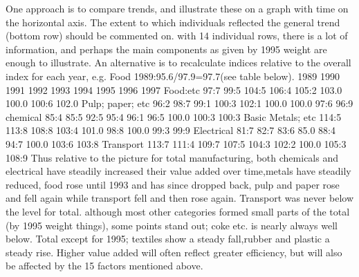 \documentclass[a4paper,12pt]{article}
\begin{document}
\begin{enumerate}
One approach is to compare trends, and illustrate these on a graph with time on the
horizontal axis. The extent to which individuals reflected the general trend (bottom
row) should be commented on. with 14 individual rows, there is a lot of information,
and perhaps the main components as given by 1995 weight are enough to illustrate.
An alternative is to recalculate indices relative to the overall index for each year, e.g.
Food 1989:95.6/97.9=97.7(see table below).
1989 1990 1991 1992 1993 1994 1995 1996 1997
Food:etc 97:7 99:5 104:5 106:4 105:2 103.0 100.0 100:6 102.0
Pulp; paper; etc 96:2 98:7 99:1 100:3 102:1 100.0 100.0 97:6 96:9
chemical 85:4 85:5 92:5 95:4 96:1 96:5 100.0 100:3 100:3
Basic Metals; etc 114:5 113:8 108:8 103:4 101.0 98:8 100.0 99:3 99:9
Electrical 81:7 82:7 83:6 85.0 88:4 94:7 100.0 103:6 103:8
Transport 113:7 111:4 109:7 107:5 104:3 102:2 100.0 105:3 108:9
Thus relative to the picture for total manufacturing, both chemicals and electrical have
steadily increased their value added over time,metals have steadily reduced, food rose
until 1993 and has since dropped back, pulp and paper rose and fell again while transport
fell and then rose again.
Transport was never below the level for total.
although most other categories formed small parts of the total (by 1995 weight things),
some points stand out; coke etc. is nearly always well below. Total except for 1995;
textiles show a steady fall,rubber and plastic a steady rise.
Higher value added will often reflect greater efficiency, but will also be affected by the
15
factors mentioned above.
\end{enumerate}
\end{document}
